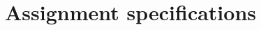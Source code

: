 \documentclass{report}
\begin{document}
	
	
	
	\section{Assignment specifications}\label{specifications}
	
	
	
\end{document}
